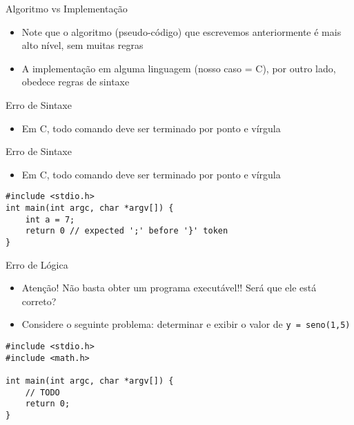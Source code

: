 \documentclass[t, aspectratio=169]{beamer}
\begin{document}
\begin{frame}[label={sec:org371f671}]{Algoritmo vs Implementação}
\begin{itemize}
\item Note que o algoritmo (pseudo-código) que escrevemos anteriormente é mais alto nível, sem muitas regras
\item A implementação em alguma linguagem (nosso caso = C), por outro lado, obedece \alert{regras de sintaxe}
\end{itemize}
\end{frame}

\begin{frame}[label={sec:org9c5acaf}]{Erro de Sintaxe}
\begin{itemize}
\item Em C, todo comando deve ser terminado por ponto e vírgula
\end{itemize}
\end{frame}

\begin{frame}[label={sec:orgae40247},fragile]{Erro de Sintaxe}
 \begin{itemize}
\item Em C, todo comando deve ser terminado por ponto e vírgula
\end{itemize}

\begin{verbatim}
#include <stdio.h>
int main(int argc, char *argv[]) {
    int a = 7;
    return 0 // expected ';' before '}' token
}
\end{verbatim}
\end{frame}

\begin{frame}[label={sec:org08ed685},fragile]{Erro de Lógica}
 \begin{itemize}
\item \alert{Atenção!} Não basta obter um programa executável!! Será que ele está correto?
\item Considere o seguinte problema: determinar e exibir o valor de \texttt{y = seno(1,5)}
\end{itemize}
\begin{verbatim}
#include <stdio.h>
#include <math.h>

int main(int argc, char *argv[]) {
    // TODO
    return 0;
}
\end{verbatim}
\end{frame}
\end{document}
